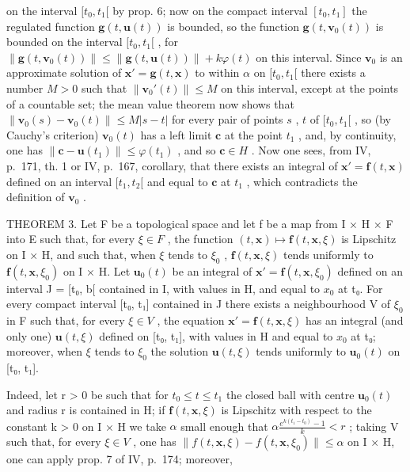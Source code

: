 on the interval \([t_0, t_1[\) by prop. 6; now on the compact interval \([t_0, t_1]\) the regulated function \(\mathbf{g}(t, \mathbf{u}(t))\) is bounded, so the function \(\mathbf{g}(t, \mathbf{v}_0(t))\) is bounded on the interval \([t_0, t_1[\) , for \(\| \mathbf{g}(t, \mathbf{v}_0(t)) \| \leqslant \| \mathbf{g}(t, \mathbf{u}(t)) \| + k\varphi(t)\) on this interval. Since \(\mathbf{v}_0\) is an approximate solution of \(\mathbf{x}' = \mathbf{g}(t, \mathbf{x})\) to within \(\alpha\) on \([t_0, t_1[\) there exists a number \(M > 0\) such that \(\| \mathbf{v}_0'(t) \| \leqslant M\) on this interval, except at the points of a countable set; the mean value theorem now shows that \(\| \mathbf{v}_0(s) - \mathbf{v}_0(t) \| \leqslant M |s - t|\) for every pair of points \(s\) , \(t\) of \([t_0, t_1[\) , so (by Cauchy's criterion) \(\mathbf{v}_0(t)\) has a left limit \(\mathbf{c}\) at the point \(t_1\) , and, by continuity, one has \(\| \mathbf{c} - \mathbf{u}(t_1) \| \leqslant \varphi(t_1)\) , and so \(\mathbf{c} \in H\) . Now one sees, from IV, p.~171, th. 1 or IV, p.~167, corollary, that there exists an integral of \(\mathbf{x}' = \mathbf{f}(t, \mathbf{x})\) defined on an interval \([t_1, t_2[\) and equal to \(\mathbf{c}\) at \(t_1\) , which contradicts the definition of \(\mathbf{v}_0\) .

THEOREM 3. Let F be a topological space and let f be a map from I × H × F into E such that, for every \(\xi \in F\) , the function \((t, \mathbf{x}) \mapsto \mathbf{f}(t, \mathbf{x}, \xi)\) is Lipschitz on I × H, and such that, when \(\xi\) tends to \(\xi_{0}\) , \(\mathbf{f}(t, \mathbf{x}, \xi)\) tends uniformly to \(\mathbf{f}(t, \mathbf{x}, \xi_{0})\) on I × H. Let \(\mathbf{u}_{0}(t)\) be an integral of \(\mathbf{x}' = \mathbf{f}(t, \mathbf{x}, \xi_{0})\) defined on an interval J = {[}t₀, b{[} contained in I, with values in H, and equal to \(x_{0}\) at t₀. For every compact interval {[}t₀, t₁{]} contained in J there exists a neighbourhood V of \(\xi_{0}\) in F such that, for every \(\xi \in V\) , the equation \(\mathbf{x}' = \mathbf{f}(t, \mathbf{x}, \xi)\) has an integral (and only one) \(\mathbf{u}(t, \xi)\) defined on {[}t₀, t₁{]}, with values in H and equal to \(x_{0}\) at t₀; moreover, when \(\xi\) tends to \(\xi_{0}\) the solution \(\mathbf{u}(t, \xi)\) tends uniformly to \(\mathbf{u}_{0}(t)\) on {[}t₀, t₁{]}.

Indeed, let r \textgreater{} 0 be such that for \(t_{0} \leqslant t \leqslant t_{1}\) the closed ball with centre \(\mathbf{u}_{0}(t)\) and radius r is contained in H; if \(\mathbf{f}(t, \mathbf{x}, \xi)\) is Lipschitz with respect to the constant k \textgreater{} 0 on I × H we take \(\alpha\) small enough that \(\alpha \frac{e^{k(t_{1}-t_{0})} - 1}{k} < r\) ; taking V such that, for every \(\xi \in V\) , one has \(\|f(t, \mathbf{x}, \xi) - f(t, \mathbf{x}, \xi_{0})\| \leqslant \alpha\) on I × H, one can apply prop. 7 of IV, p.~174; moreover,

